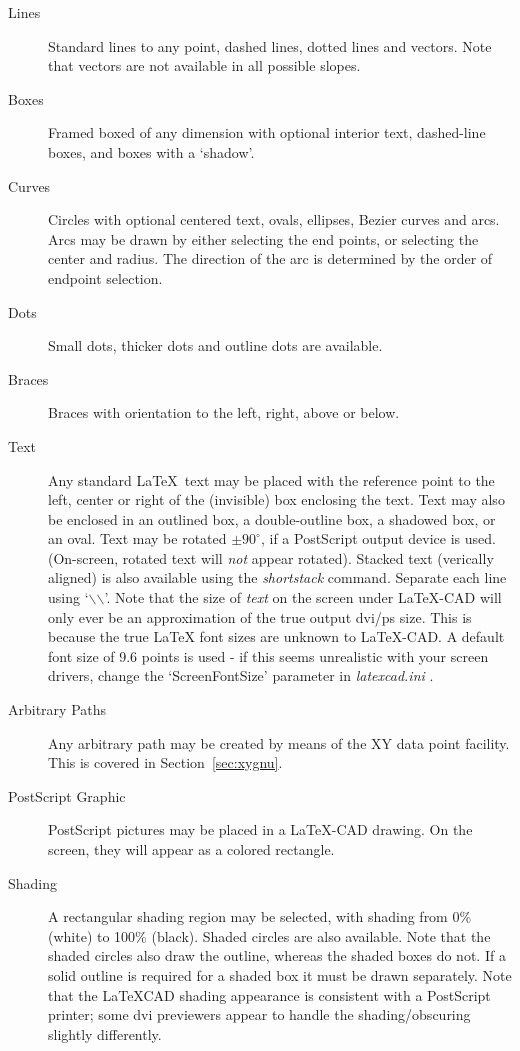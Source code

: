 \documentclass[a4paper]{article}
\newcommand{\bs}{$\backslash$}
\begin{document}
\begin{description}
    \item[Lines] Standard lines to any point, dashed lines,
            dotted lines and vectors. Note that
            vectors are not available in all possible
            slopes.
    \item[Boxes] Framed boxed of any dimension with optional
            interior text, dashed-line boxes, and
            boxes with a `shadow'.
    \item[Curves] Circles with optional centered text,
            ovals, ellipses, Bezier curves and arcs.
            Arcs may be drawn by either selecting the
            end points, or selecting the center and
            radius. The direction of the arc is determined
            by the order of endpoint selection.
    \item[Dots] Small dots, thicker dots and outline dots are available.
    \item[Braces] Braces with orientation to the left, right,
            above or below.
    \item[Text] Any standard \LaTeX\ text may be placed with the
            reference point to the left, center or
            right of the (invisible) box enclosing the
            text. Text may also be enclosed in an outlined box,
            a double-outline box, a shadowed box, or an oval.
            Text may be rotated $\pm 90^\circ $, if a
            PostScript output device is used.
            (On-screen, rotated text will \emph{not} appear rotated).
            Stacked text (verically aligned)
            is also available using the \textit{shortstack} command.
            Separate each line using `\bs\bs'. Note that the
            size of \textit{text} on the screen under LaTeX-CAD will only
            ever be an approximation of the true output dvi/ps
            size. This is because the true \LaTeX\/ font sizes are
            unknown to LaTeX-CAD. A default font size of 9.6 points
            is used - if this seems unrealistic with your screen
            drivers, change the `ScreenFontSize' parameter in
            \textit{latexcad.ini} .

    \item[Arbitrary Paths] Any arbitrary path may be created by
            means of the XY data point facility. This is
            covered in Section~\ref{sec:xygnu}.
    \item[PostScript Graphic] PostScript pictures may be placed in a
            \LaTeX-CAD drawing. On the screen, they will
            appear as a colored rectangle.
    \item[Shading] A rectangular shading region may be selected, with shading
            from 0\% (white) to 100\% (black). Shaded circles are also
            available. Note that the shaded circles also draw the
            outline, whereas the shaded boxes do not. If a solid outline
            is required for a shaded box it must be drawn separately.
            Note that the LaTeXCAD shading appearance is consistent
            with a PostScript printer; some \textsf{dvi} previewers
            appear to handle the shading/obscuring slightly differently.
\end{description}
\end{document}
